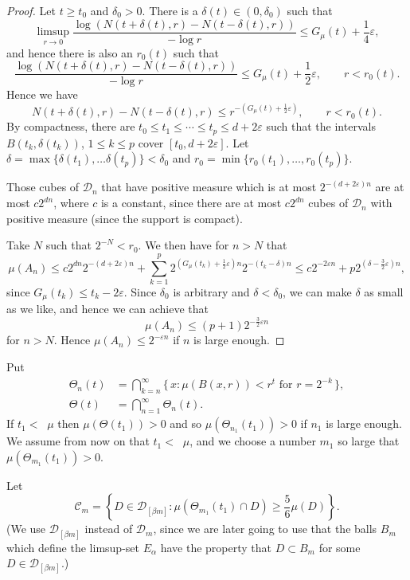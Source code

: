 \documentclass[10pt]{amsart}
\theoremstyle{definition}\newtheorem{defi}[theo]{Definition}\newtheorem{rema}[theo]{Remark}\newtheorem{exam}[theo]{Example}\newtheorem{exem}[theo]{Example}\newtheorem{nota}[theo]{Notation}
\DeclareMathOperator{\udimh}{\overline{dim}_H}
\begin{document}
\begin{proof}
Let $t \geq t_0$ and $\delta_0 > 0$. There is a $\delta (t) \in (0,
\delta_0)$ such that
\[
\limsup_{r \to 0} \frac{\log (N(t + \delta (t), r) - N(t - \delta (t), r))}{- \log r} \leq G_\mu (t) + \frac{1}{4} \varepsilon,
\]
and hence there is also an $r_0 (t)$ such that
\[
\frac{\log (N(t + \delta (t), r) - N(t - \delta (t), r))}{- \log r}
\leq G_\mu (t) + \frac{1}{2} \varepsilon, \qquad r < r_0 (t).
\]
Hence we have
\[
N(t + \delta (t), r) - N(t - \delta (t), r) \leq r^{-(G_\mu (t) +
\frac{1}{2} \varepsilon)}, \qquad r < r_0 (t).
\]
By compactness, there are $t_0 \leq t_1 \leq \cdots \leq t_p \leq d + 2 \varepsilon$ such that the intervals $B(t_k, \delta (t_k))$, $1
\leq k \leq p$ cover $[t_0, d + 2 \varepsilon]$. Let $\delta = \max
\{\delta (t_1), \ldots \delta (t_p) \} < \delta_0$ and $r_0 = \min
\{ r_0 (t_1), \ldots, r_0 (t_p) \}$.

Those cubes of $\mathscr{D}_n$ that have positive measure which is at most $2^{-(d + 2 \varepsilon) n}$ are at most $c 2^{dn}$, where $c$ is a constant, since there are at most $c 2^{dn}$ cubes of $\mathscr{D}_n$ with positive measure (since the support is compact).

Take $N$ such that $2^{-N} < r_0$. We then have for $n > N$ that
\[
\mu (A_n) \leq c 2^{dn} 2^{-(d + 2 \varepsilon) n} + \sum_{k = 1}^p 2^{(G_\mu (t_k) + \frac{1}{2} \varepsilon) n} 2^{-(t_k - \delta) n}
\leq c 2^{- 2 \varepsilon n} + p 2^{(\delta - \frac{3}{2}
\varepsilon)n},
\]
since $G_\mu (t_k) \leq t_k - 2 \varepsilon$. Since $\delta_0$ is arbitrary and $\delta < \delta_0$, we can make $\delta$ as small as we like, and hence we can achieve that
\[
\mu (A_n) \leq (p+1) 2^{- \frac{3}{2} \varepsilon n}
\]
for $n > N$. Hence $\mu (A_n) \leq 2^{- \varepsilon n}$ if $n$ is large enough.
\end{proof}

Put
\begin{align*}
\Theta_n (t) &= \bigcap_{k=n}^\infty \{\, x : \mu (B(x,r)) < r^t
\text{ for } r = 2^{- k} \,\}, \\ \Theta (t) &= \bigcap_{n=1}^\infty
\Theta_n (t).
\end{align*}
If $t_1 < \udimh \mu$ then $\mu (\Theta (t_1)) > 0$ and so $\mu (\Theta_{n_1} (t_1)) > 0$ if $n_1$ is large enough. We assume from now on that $t_1 < \udimh \mu$, and we choose a number $m_1$ so large that $\mu (\Theta_{m_1} (t_1)) > 0$.

Let
\[
\mathscr{C}_m = \left\{ D \in \mathscr{D}_{[\beta m]} : \mu (\Theta_{m_1} (t_1) \cap D) \geq \frac{5}{6} \mu (D) \right\}.
\]
(We use $\mathscr{D}_{[\beta m]}$ instead of $\mathscr{D}_m$, since we are later going to use that the balls $B_m$ which define the limsup-set $E_\alpha$ have the property that $D \subset B_m$ for some $D \in \mathscr{D}_{[\beta m]}$.)
\end{document}
